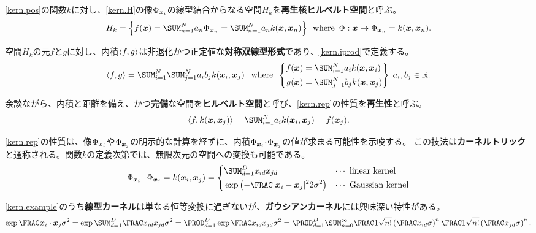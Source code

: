 \documentclass[10pt,a4paper]{book}
\begin{document}
\eqref{kern.pos}の関数$k$に対し、\eqref{kern.H}の像$\Phi_{\bm{x}_{i}}$の線型結合からなる空間$H_k$を\textbf{再生核ヒルベルト空間}と呼ぶ。
%
\begin{equation}
\label{eq:kern.H}
H_k = \seq{f(\bm{x}) = \sum_{n=1}^N a_n \Phix{n} = \sum_{n=1}^N a_n k(\bm{x}, \bm{x}_n)}
\where \Phi: \bm{x} \mapsto \Phix{n} = k(\bm{x}, \bm{x}_n).
\end{equation}

空間$H_k$の元$f$と$g$に対し、内積$\left\langle f,g\right\rangle$は非退化かつ正定値な\textbf{対称双線型形式}であり、\eqref{kern.iprod}で定義する。
%
\begin{equation}
\label{eq:kern.iprod}
\iprod{f}{g} = \sum_{i=1}^N \sum_{j=1}^N a_i b_j k(\bm{x}_i, \bm{x}_j)\;
\where\left\{
\begin{aligned}
f(\bm{x}) &= \sum_{i=1}^N a_i k(\bm{x}, \bm{x}_i) \\
g(\bm{x}) &= \sum_{j=1}^N b_j k(\bm{x}, \bm{x}_j) \\
\end{aligned}
\right\}\;
a_i,b_j \in \mathbb{R}.
\end{equation}

余談ながら、内積と距離を備え、かつ\textbf{完備}な空間を\textbf{ヒルベルト空間}と呼び、\eqref{kern.rep}の性質を\textbf{再生性}と呼ぶ。
%
\begin{equation}
\label{eq:kern.rep}
\iprod{f}{k(\bm{x},\bm{x}_j)} = \sum_{i=1}^N a_i k(\bm{x}_i, \bm{x}_j) = f(\bm{x}_j).
\end{equation}

\eqref{kern.rep}の性質は、像$\Phi_{\bm{x}_{i}}$や$\Phi_{\bm{x}_{j}}$の明示的な計算を経ずに、内積$\Phi_{\bm{x}_{i}}\! \cdot \!\Phi_{\bm{x}_{j}}$の値が求まる可能性を示唆する。
この技法は\textbf{カーネルトリック}と通称される。関数$k$の定義次第では、無限次元の空間への変換も可能である。
%
\begin{equation}
\label{eq:kern.example}
\dprod{\Phix{i}}{\Phix{j}} = k(\bm{x}_i,\bm{x}_j) = \left\{
\begin{aligned}
& \sum_{d=1}^D x_{id} x_{jd} && \text{$\cdots$ linear kernel} \\
& \exp \left(-\frac{|\bm{x}_i - \bm{x}_j|^2}{2\sigma^2}\right) && \text{$\cdots$ Gaussian kernel}
\end{aligned}
\right.
\end{equation}

\eqref{kern.example}のうち\textbf{線型カーネル}は単なる恒等変換に過ぎないが、\textbf{ガウシアンカーネル}には興味深い特性がある。
%
\begin{equation}
\label{eq:kern.gauss}
\exp \frac{\dprod{\bm{x}_i}{\bm{x}_j}}{\sigma^2}
= \exp \sum_{d=1}^D \frac{x_{id} x_{jd}}{\sigma^2}
= \prod_{d=1}^D \exp \frac{x_{id} x_{jd}}{\sigma^2}
= \prod_{d=1}^D \sum_{n=0}^\infty
\frac{1}{\sqrt{n!}} \left(\frac{x_{id}}{\sigma}\right)^n
\frac{1}{\sqrt{n!}} \left(\frac{x_{jd}}{\sigma}\right)^n.
\end{equation}
\end{document}
